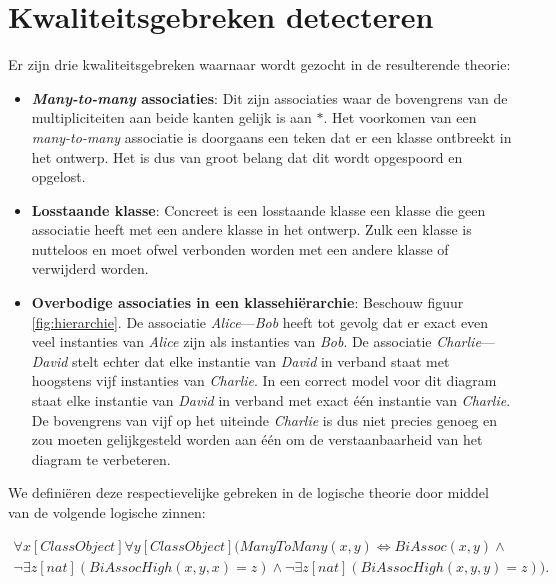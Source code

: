\section{Kwaliteitsgebreken detecteren}
Er zijn drie kwaliteitsgebreken waarnaar wordt gezocht in de resulterende theorie:

\begin{itemize}
	\item \textbf{\textit{Many-to-many} associaties}: Dit zijn associaties waar de bovengrens van de multipliciteiten aan beide kanten gelijk is aan $*$. Het voorkomen van een \textit{many-to-many} associatie is doorgaans een teken dat er een klasse ontbreekt in het ontwerp. Het is dus van groot belang dat dit wordt opgespoord en opgelost.
	
	\item \textbf{Losstaande klasse}: Concreet is een losstaande klasse een klasse die geen associatie heeft met een andere klasse in het ontwerp. Zulk een klasse is nutteloos en moet ofwel verbonden worden met een andere klasse of verwijderd worden.
	
	\item \textbf{Overbodige associaties in een klassehi\"erarchie}\cite{Balaban2015}: Beschouw figuur \ref{fig:hierarchie}. De associatie \textit{Alice}---\textit{Bob} heeft tot gevolg dat er exact even veel instanties van \textit{Alice} zijn als instanties van \textit{Bob}. De associatie \textit{Charlie}---\textit{David} stelt echter dat elke instantie van \textit{David} in verband staat met hoogstens vijf instanties van \textit{Charlie}. In een correct model voor dit diagram staat elke instantie van \textit{David} in verband met exact \'e\'en instantie van \textit{Charlie}. De bovengrens van vijf op het uiteinde \textit{Charlie} is dus niet precies genoeg en zou moeten gelijkgesteld worden aan \'e\'en om de verstaanbaarheid van het diagram te verbeteren.
\end{itemize}

We defini\"eren deze respectievelijke gebreken in de logische theorie door middel van de volgende logische zinnen:

\begin{align}
	\nonumber \forall{x}[ClassObject]\forall{y}[ClassObject](ManyToMany(x,y) \Leftrightarrow BiAssoc(x,y) \land \\ \lnot\exists{z}[nat](BiAssocHigh(x,y,x) = z) \land \lnot\exists{z}[nat](BiAssocHigh(x,y,y) = z)).\label{form:manytomany}
\end{align}

